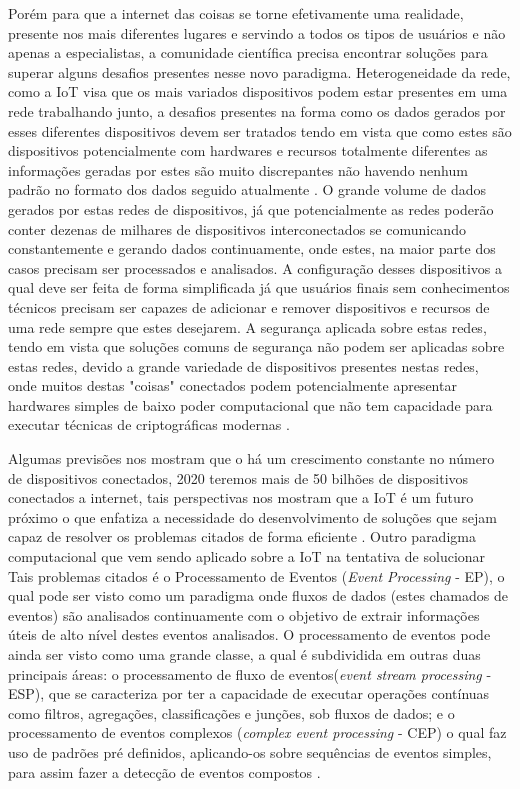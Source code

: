 \documentclass[tid,table]{texufpel} %
\begin{document}
Porém para que a internet das coisas se torne efetivamente uma realidade, presente nos mais diferentes lugares e servindo a todos os tipos de usuários e não apenas a especialistas, a comunidade científica precisa encontrar soluções para superar alguns desafios presentes nesse novo paradigma. Heterogeneidade da rede, como a IoT visa que os mais variados dispositivos podem estar presentes em uma rede trabalhando junto, a desafios presentes na forma como os dados gerados por esses diferentes dispositivos devem ser tratados tendo em vista que como estes são dispositivos potencialmente com hardwares e recursos totalmente diferentes as informações geradas por estes são muito discrepantes não havendo nenhum padrão no formato dos dados seguido atualmente \cite{agrawal2013survey}. O grande volume de dados gerados por estas redes de dispositivos, já que potencialmente as redes poderão conter dezenas de milhares de dispositivos interconectados se comunicando constantemente e gerando dados continuamente, onde estes, na maior parte dos casos precisam ser processados e analisados. A configuração desses dispositivos a qual deve ser feita de forma simplificada já que usuários finais sem conhecimentos técnicos precisam ser capazes de adicionar e remover dispositivos e recursos de uma rede sempre que estes desejarem. A segurança aplicada sobre estas redes, tendo em vista que soluções comuns de segurança não podem ser aplicadas sobre estas redes,  devido a grande variedade de dispositivos presentes nestas redes, onde muitos destas "coisas" conectados podem potencialmente apresentar hardwares simples de baixo poder computacional que não tem capacidade para executar técnicas de criptográficas modernas \cite{agrawal2013survey}.


Algumas previsões nos mostram que o há um crescimento constante no número de dispositivos conectados, 2020 teremos mais de 50 bilhões de dispositivos conectados a internet, tais perspectivas nos mostram que a IoT é um futuro próximo o que enfatiza a necessidade do desenvolvimento de soluções que sejam capaz de resolver os problemas citados de forma eficiente \cite{xavier2016smart}. Outro paradigma computacional que vem sendo aplicado sobre a IoT na tentativa de solucionar Tais problemas citados é o  Processamento de Eventos (\textit{Event Processing} - EP), o qual pode ser visto como um paradigma onde fluxos de dados (estes chamados de eventos) são analisados continuamente com o objetivo de extrair informações úteis de alto nível destes eventos analisados. O processamento de eventos pode ainda ser visto como uma grande classe, a qual é subdividida em outras duas principais áreas: o processamento de fluxo de eventos(\textit{event stream processing} - ESP), que se caracteriza por ter a capacidade de executar operações contínuas como filtros, agregações, classificações e junções, sob fluxos de dados; e o processamento de eventos complexos (\textit{complex event processing} - CEP) o qual faz uso de padrões pré definidos, aplicando-os sobre sequências de eventos simples, para assim fazer a detecção de eventos compostos \cite{dayarathna2018recent}.
\end{document}
